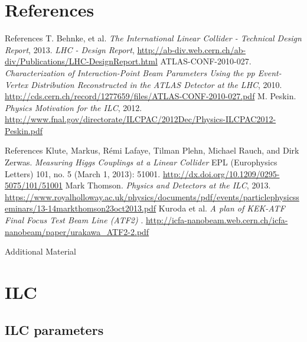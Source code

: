 \documentclass[xcolor={dvipsnames}]{beamer}
\begin{document}
\section*{References}
\begin{thebibliography}{9}
\begin{frame}{References}
 T. Behnke, et al.
\emph{The International Linear Collider - Technical Design Report}, 2013.
 \emph{LHC - Design Report}, \url{http://ab-div.web.cern.ch/ab-div/Publications/LHC-DesignReport.html}
 ATLAS-CONF-2010-027. \emph{Characterization of Interaction-Point Beam Parameters Using the pp Event-Vertex Distribution Reconstructed in the ATLAS Detector at the LHC}, 2010. \url{http://cds.cern.ch/record/1277659/files/ATLAS-CONF-2010-027.pdf}
 M. Peskin. \emph{Physics Motivation for the ILC}, 2012. \url{http://www.fnal.gov/directorate/ILCPAC/2012Dec/Physics-ILCPAC2012-Peskin.pdf}
\end{frame}
\begin{frame}{References}
 Klute, Markus, Rémi Lafaye, Tilman Plehn, Michael Rauch, and
Dirk Zerwas. \emph{Measuring Higgs Couplings at a Linear Collider}
EPL (Europhysics Letters) 101, no. 5 (March 1, 2013): 51001. \url{http://dx.doi.org/10.1209/0295-5075/101/51001}
 Mark Thomson. \emph{Physics and Detectors at the ILC}, 2013. \url{https://www.royalholloway.ac.uk/physics/documents/pdf/events/particlephysicsseminars/13-14markthomson23oct2013.pdf}
 Kuroda et al. \emph{A plan of KEK-ATF Final Focus Test Beam Line (ATF2)
}. \url{http://icfa-nanobeam.web.cern.ch/icfa-nanobeam/paper/urakawa_ATF2-2.pdf}

\end{frame}
\end{thebibliography}

\appendix

\begin{frame}
\begin{center}
\LARGE Additional Material
\end{center}
  \tableofcontents
\end{frame}

\section{ILC}
\subsection{ILC parameters}
\end{document}
